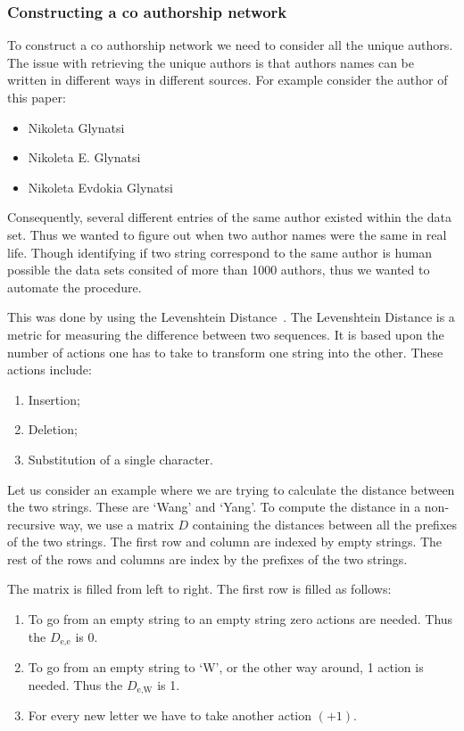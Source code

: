 \documentclass{article}
\theoremstyle{definition}
\begin{document}
\subsubsection{Constructing a co authorship network}

To construct a co authorship network we need to consider all the unique authors.
The issue with retrieving the unique authors is that authors names can be written
in different ways in different sources. For example consider the author of this
paper:

\begin{itemize}
    \item Nikoleta Glynatsi
    \item Nikoleta E. Glynatsi
    \item Nikoleta Evdokia Glynatsi
\end{itemize}

Consequently, several different entries of the same author existed within the data
set. Thus we wanted to figure out when two author names were the same in real life.
Though identifying if two string correspond to the same author is human possible
the data sets consited of more than 1000 authors, thus we wanted to automate the
procedure.

This was done by using the Levenshtein Distance~\cite{miller2009}. The Levenshtein
Distance is a metric for measuring the difference between two sequences. It is
based upon the number of actions one has to take to transform one string into
the other. These actions include:

\begin{enumerate}
    \item Insertion;
    \item Deletion;
    \item Substitution of a single character.
\end{enumerate}

Let us consider an example where we are trying to calculate the distance between
the two strings. These are `Wang' and `Yang'. To compute the distance in a non-recursive
way, we use a matrix \(D\) containing the distances between all the prefixes of the
two strings. The first row and column are indexed by empty strings. The rest of
the rows and columns are index by the prefixes of the two strings.

The matrix is filled from left to right. The first row is filled as follows:

\begin{enumerate}
    \item To go from an empty string to an empty string zero actions are needed.
    Thus the \(D_{\text{e}, \text{e}}\) is 0.
    \item To go from an empty string to `W', or the other way around, 1 action
    is needed. Thus the \(D_{\text{e}, \text{W}}\) is 1.
    \item For every new letter we have to take another action \((+1)\).
\end{enumerate}
\end{document}
